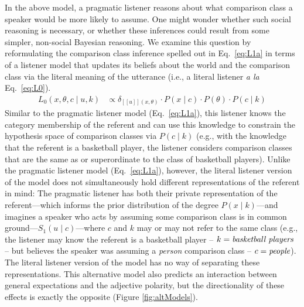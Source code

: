 \documentclass[doc, floatsintext]{apa6}
\newcommand{\ndg}[1]{\textcolor{Green}{[ndg: #1]}}
\begin{document}
In the above model, a pragmatic listener reasons about what comparison class a speaker would be more likely to assume.
One might wonder whether such social reasoning is necessary, or whether these inferences could result from some simpler, non-social Bayesian reasoning. 
We examine this question by reformulating the comparison class inference spelled out in Eq.~\ref{eq:L1a} in terms of a listener model that updates its beliefs about the world and the comparison class via the literal meaning of the utterance (i.e., a literal listener \emph{a la} Eq.~\ref{eq:L0}). 
%
%
  \begin{align}
L_{0}(x, \theta, c \mid u, k) &\propto \delta_{[\![u]\!](x, \theta)} \cdot P(x \mid c)\cdot P(\theta) \cdot P(c \mid k)  \label{eq:L0alt}
\end{align}
%
Similar to the pragmatic listener model (Eq.~\ref{eq:L1a}), this listener knows the category membership of the referent and can use this knowledge to constrain the hypothesis space of comparison classes via $P(c \mid k)$ (e.g., with the knowledge that the referent is a basketball player, the listener considers comparison classes that are the same as or superordinate to the class of basketball players).
Unlike the pragmatic listener model (Eq.~\ref{eq:L1a}), however, the literal listener version of the model does not simultaneously hold different representations of the referent in mind: The pragmatic listener has both their private representation of the referent---which informs the prior distribution of the degree $P(x \mid k)$---and imagines a speaker who acts by assuming some comparison class is in common ground---$S_1(u \mid c)$---where $c$ and $k$ may or may not refer to the same class (e.g., the listener may know the referent is a basketball player -- $k = \emph{basketball players}$ -- but believes the speaker was assuming a \emph{person} comparison class -- $c = \emph{people}$).
The literal listener version of the model has no way of separating these representations.
This alternative model also predicts an interaction between general expectations and the adjective polarity, but the directionality of these effects is exactly the opposite (Figure \ref{fig:altModels}).
\end{document}
